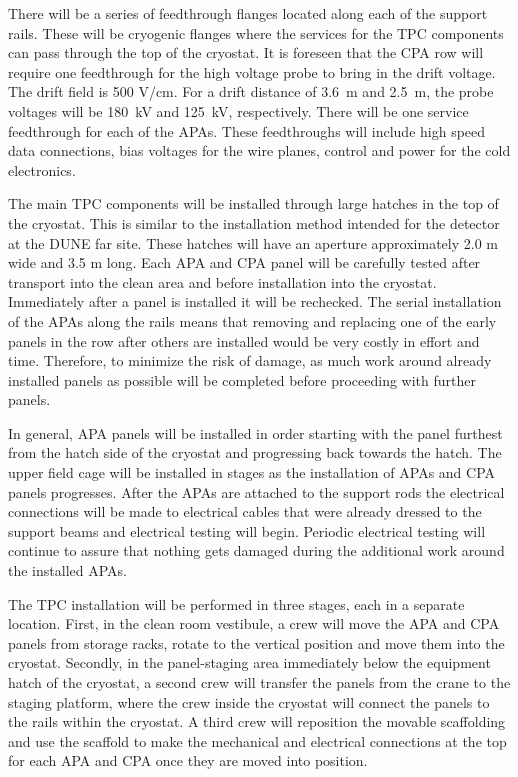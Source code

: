 There will be a series of feedthrough flanges located along each of the support rails.  These will be cryogenic flanges where the services for the TPC components can pass through the top of the cryostat.  It is foreseen that the CPA row will require one feedthrough for the high voltage probe to bring in the drift voltage.  The drift field is 500 V/cm.  For a drift distance of 3.6~m and 2.5~m, the probe voltages will be 180~kV and 125~kV, respectively.  There will be one service feedthrough for each of the APAs.  These feedthroughs will include high speed data connections, bias voltages for the wire planes, control and power for the cold electronics.  

The main TPC components will be installed through large hatches in the top of the cryostat.  This is 
similar to the installation method intended for the detector at the DUNE far site.  These hatches will have an 
aperture approximately 2.0 m wide and 3.5 m long.  Each APA and CPA panel will be carefully tested after transport into the clean area and before installation into the cryostat. Immediately after a panel is installed it will be rechecked. The serial installation of the APAs along the rails means that removing and replacing one of the early panels in the row after others are installed would be very costly in effort and time. Therefore, to minimize the risk of damage, as much work around already installed panels as possible will be completed before proceeding with further panels.
 
In general, APA panels will be installed in order starting with the panel furthest from the hatch side of the cryostat and progressing back towards the hatch. The upper field cage will be installed in stages as the installation of APAs and CPA panels progresses.  After the APAs are attached to the support rods the electrical connections will be made to electrical cables that were already dressed to the support beams and electrical testing will begin. Periodic electrical testing will continue to assure that nothing gets  damaged during the additional work around the installed APAs.  

The TPC installation will be performed in three stages, each in a separate location. First, in the clean room vestibule, a crew will move the APA and CPA panels from storage racks, rotate to the vertical position and move them into the cryostat. Secondly, in the panel-staging area immediately below the equipment hatch of the cryostat, 
a second crew will transfer the panels from the crane to the staging platform, where the crew inside the cryostat will connect the panels to the rails within the cryostat. A third crew will reposition the movable scaffolding and use the scaffold to make the mechanical and electrical connections at the top for each APA and CPA once they are moved into position.  

